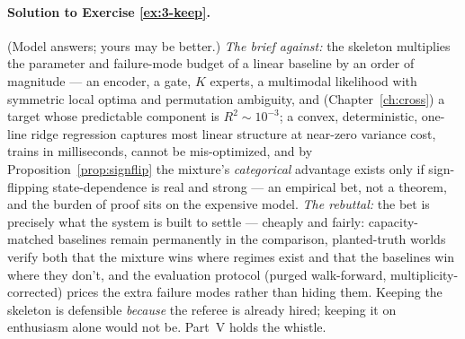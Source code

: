 \paragraph{Solution to Exercise \ref{ex:3-keep}.}
(Model answers; yours may be better.) \emph{The brief against:} the
skeleton multiplies the parameter and failure-mode budget of a linear
baseline by an order of magnitude --- an encoder, a gate, $K$ experts, a
multimodal likelihood with symmetric local optima and permutation
ambiguity, and (Chapter~\ref{ch:cross}) a target whose predictable
component is $R^2 \sim 10^{-3}$; a convex, deterministic, one-line ridge
regression captures most linear structure at near-zero variance cost,
trains in milliseconds, cannot be mis-optimized, and by
Proposition~\ref{prop:signflip} the mixture's \emph{categorical} advantage
exists only if sign-flipping state-dependence is real and strong --- an
empirical bet, not a theorem, and the burden of proof sits on the
expensive model. \emph{The rebuttal:} the bet is precisely what the system
is built to settle --- cheaply and fairly: capacity-matched baselines
remain permanently in the comparison, planted-truth worlds verify both
that the mixture wins where regimes exist and that the baselines win where
they don't, and the evaluation protocol (purged walk-forward,
multiplicity-corrected) prices the extra failure modes rather than hiding
them. Keeping the skeleton is defensible \emph{because} the referee is
already hired; keeping it on enthusiasm alone would not be. Part~V holds
the whistle.
